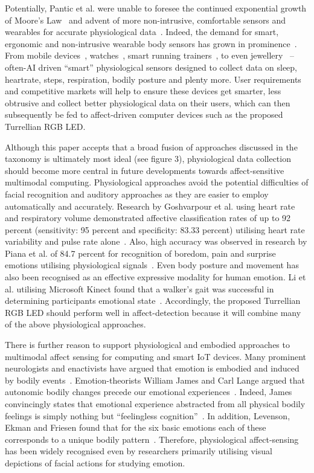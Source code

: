 \documentclass{sigchi}
\begin{document}
Potentially, Pantic et al. were unable to foresee the continued exponential growth of Moore’s Law~\cite{lundstrom2003moore} and advent of more non-intrusive, comfortable sensors and wearables for accurate physiological data~\cite{chen2012making, pantic2008human}. Indeed, the demand for smart, ergonomic and non-intrusive wearable body sensors has grown in prominence~\cite{chen2012making}. From mobile devices~\cite{rodgers2014recent}, watches~\cite{kim2015acceptance}, smart running trainers~\cite{hurford2009types}, to even jewellery~\cite{ju2015smart} – often-AI driven “smart” physiological sensors designed to collect data on sleep, heartrate, steps, respiration, bodily posture and plenty more. User requirements and competitive markets will help to ensure these devices get smarter, less obtrusive and collect better physiological data on their users, which can then subsequently be fed to affect-driven computer devices such as the proposed Turrellian RGB LED. 

Although this paper accepts that a broad fusion of approaches discussed in the taxonomy is ultimately most ideal (see figure 3), physiological data collection should become more central in future developments towards affect-sensitive multimodal computing. Physiological approaches avoid the potential difficulties of facial recognition and auditory approaches as they are easier to employ automatically and accurately. Research by Goshvarpour et al. using heart rate and respiratory volume demonstrated affective classification rates of up to 92 percent (sensitivity: 95 percent and specificity: 83.33 percent) utilising heart rate variability and pulse rate alone~\cite{goshvarpour2017fusion}. Also, high accuracy was observed in research by Piana et al. of 84.7 percent for recognition of boredom, pain and surprise emotions utilising physiological signals~\cite{piana2014real}. Even body posture and movement has also been recognised as an effective expressive modality for human emotion. Li et al. utilising Microsoft Kinect found that a walker’s gait was successful in determining participants emotional state~\cite{li2016emotion}. Accordingly, the proposed Turrellian RGB LED should perform well in affect-detection because it will combine many of the above physiological approaches. 

There is further reason to support physiological and embodied approaches to multimodal affect sensing for computing and smart IoT devices. Many prominent neurologists and enactivists have argued that emotion is embodied and induced by bodily events~\cite{colombetti2008feeling}. Emotion-theorists William James and Carl Lange argued that autonomic bodily changes precede our emotional experiences~\cite{james1994physical, lange1885om}. Indeed, James convincingly states that emotional experience abstracted from all physical bodily feelings is simply nothing but “feelingless cognition”~\cite{james1894discussion, james1922emotions}. In addition, Levenson, Ekman and Friesen found that for the six basic emotions each of these corresponds to a unique bodily pattern~\cite{levenson1990voluntary, prinz2004gut}. Therefore, physiological affect-sensing has been widely recognised even by researchers primarily utilising visual depictions of facial actions for studying emotion.
\end{document}

